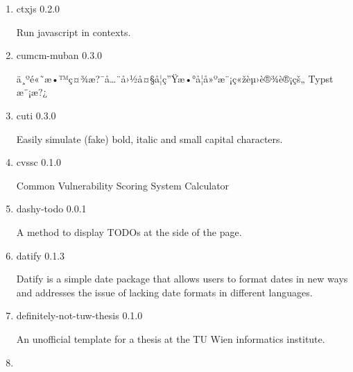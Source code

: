 \begin{enumerate}
  { ctheorems } { 1.1.3 }

  Numbered theorem environments for typst.
\item
  \href{/universe/package/ctxjs/}{}

  { ctxjs } { 0.2.0 }

  Run javascript in contexts.
\item
  \href{/universe/package/cumcm-muban/}{}


  { cumcm-muban } { 0.3.0 }

  ä¸ºé«˜æ•™ç¤¾æ?¯å\ldots¨å›½å¤§å­¦ç''Ÿæ•°å­¦å»ºæ¨¡ç«žèµ›è®¾è®¡çš„ Typst
  æ¨¡æ?¿
\item
  \href{/universe/package/cuti/}{}

  { cuti } { 0.3.0 }

  Easily simulate (fake) bold, italic and small capital characters.
\item
  \href{/universe/package/cvssc/}{}

  { cvssc } { 0.1.0 }

  Common Vulnerability Scoring System Calculator
\item
  \href{/universe/package/dashy-todo/}{}

  { dashy-todo } { 0.0.1 }

  A method to display TODOs at the side of the page.
\item
  \href{/universe/package/datify/}{}

  { datify } { 0.1.3 }

  Datify is a simple date package that allows users to format dates in
  new ways and addresses the issue of lacking date formats in different
  languages.
\item
  \href{/universe/package/definitely-not-tuw-thesis/}{}


  { definitely-not-tuw-thesis } { 0.1.0 }

  An unofficial template for a thesis at the TU Wien informatics
  institute.
\item
  \href{/universe/package/delegis/}{}



\end{enumerate}
